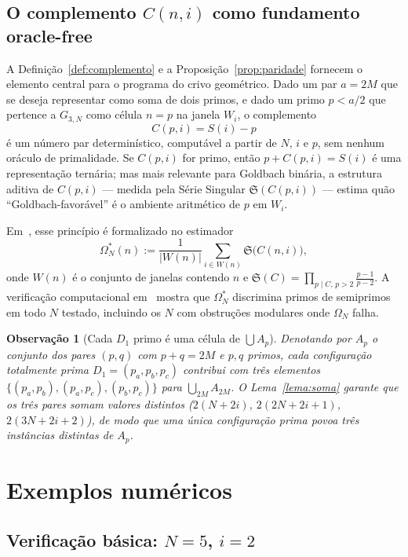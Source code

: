 \documentclass[12pt, a4paper]{article}
\newtheorem{observacao}[lema]{Observação}
\begin{document}
	\subsection{O complemento $C(n,i)$ como fundamento oracle-free}
	
	A Definição~\ref{def:complemento} e a Proposição~\ref{prop:paridade} fornecem o
	elemento central para o programa do crivo geométrico. Dado um par $a=2M$ que se
	deseja representar como soma de dois primos, e dado um primo $p<a/2$ que pertence
	a $G_{3,N}$ como célula $n=p$ na janela $W_i$, o complemento
	\[
	C(p,i) = S(i) - p
	\]
	é um número par determinístico, computável a partir de $N$, $i$ e $p$, sem
	nenhum oráculo de primalidade. Se $C(p,i)$ for primo, então $p+C(p,i)=S(i)$
	é uma representação ternária; mas mais relevante para Goldbach binária, a
	estrutura aditiva de $C(p,i)$ — medida pela Série Singular $\mathfrak{S}(C(p,i))$
	— estima quão ``Goldbach-favorável'' é o ambiente aritmético de $p$ em $W_i$.
	
	Em~\cite{bandeira2026c}, esse princípio é formalizado no estimador
	\[
	\Omega^*_N(n) := \frac{1}{|W(n)|}\sum_{i\in W(n)} \mathfrak{S}\bigl(C(n,i)\bigr),
	\]
	onde $W(n)$ é o conjunto de janelas contendo $n$ e
	$\mathfrak{S}(C)=\prod_{p\mid C,\,p>2}\frac{p-1}{p-2}$.
	A verificação computacional em~\cite{bandeira2026c} mostra que $\Omega^*_N$
	discrimina primos de semiprimos em todo $N$ testado, incluindo os $N$ com obstruções
	modulares onde $\Omega_N$ falha.
	
	\begin{observacao}[Cada $D_1$ primo é uma célula de $\bigcup A_p$]
		Denotando por $A_p$ o conjunto dos pares $(p,q)$ com $p+q=2M$ e $p,q$ primos,
		cada configuração totalmente prima $D_1=(p_a,p_b,p_c)$ contribui com três elementos
		$\{(p_a,p_b),(p_a,p_c),(p_b,p_c)\}$ para $\bigcup_{2M} A_{2M}$.
		O Lema~\ref{lema:soma} garante que os três pares somam valores \emph{distintos}
		($2(N+2i)$, $2(2N+2i+1)$, $2(3N+2i+2)$), de modo que uma única configuração prima
		povoa três instâncias distintas de $A_p$.
	\end{observacao}
	
	\section{Exemplos numéricos}
	\label{sec:exemplos}
	
	\subsection{Verificação básica: $N=5$, $i=2$}
	
\end{document}
